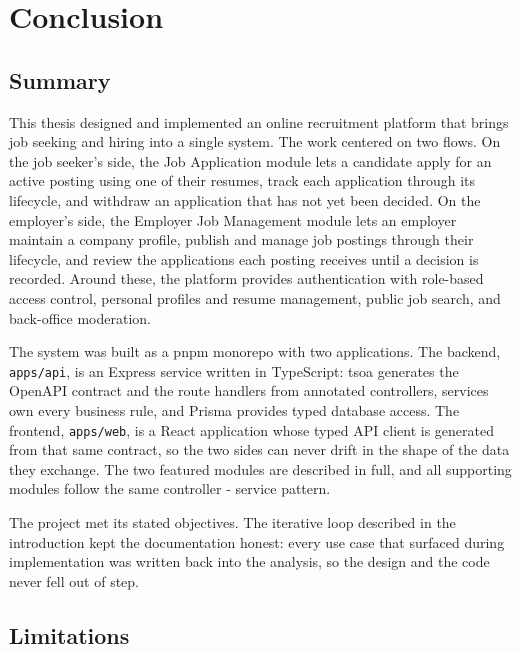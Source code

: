 
\chapter{Conclusion}
\label{chapter:conclusion}

\section{Summary}

This thesis designed and implemented an online recruitment platform that brings job seeking and hiring into a single system. The work centered on two flows. On the job seeker's side, the Job Application module lets a candidate apply for an active posting using one of their resumes, track each application through its lifecycle, and withdraw an application that has not yet been decided. On the employer's side, the Employer Job Management module lets an employer maintain a company profile, publish and manage job postings through their lifecycle, and review the applications each posting receives until a decision is recorded. Around these, the platform provides authentication with role-based access control, personal profiles and resume management, public job search, and back-office moderation.

The system was built as a pnpm monorepo with two applications. The backend, \texttt{apps/api}, is an Express service written in TypeScript: tsoa generates the OpenAPI contract and the route handlers from annotated controllers, services own every business rule, and Prisma provides typed database access. The frontend, \texttt{apps/web}, is a React application whose typed API client is generated from that same contract, so the two sides can never drift in the shape of the data they exchange. The two featured modules are described in full, and all supporting modules follow the same controller - service pattern.

The project met its stated objectives. The iterative loop described in the introduction kept the documentation honest: every use case that surfaced during implementation was written back into the analysis, so the design and the code never fell out of step.

\section{Limitations}

